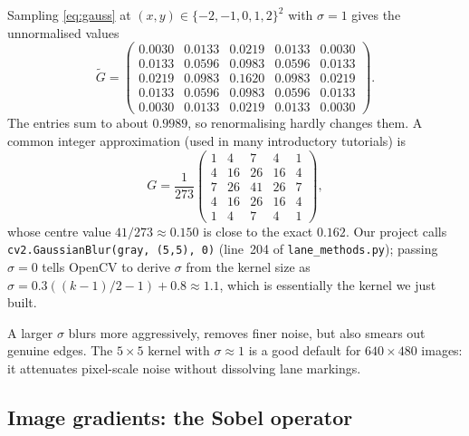 \begin{example}[$5\times 5$ Gaussian with $\sigma=1$]
Sampling \eqref{eq:gauss} at $(x,y)\in\{-2,-1,0,1,2\}^2$ with
$\sigma=1$ gives the unnormalised values
\[
\tilde G=\begin{pmatrix}
0.0030 & 0.0133 & 0.0219 & 0.0133 & 0.0030\\
0.0133 & 0.0596 & 0.0983 & 0.0596 & 0.0133\\
0.0219 & 0.0983 & 0.1620 & 0.0983 & 0.0219\\
0.0133 & 0.0596 & 0.0983 & 0.0596 & 0.0133\\
0.0030 & 0.0133 & 0.0219 & 0.0133 & 0.0030
\end{pmatrix}.
\]
The entries sum to about $0.9989$, so renormalising hardly changes
them. A common integer approximation (used in many introductory
tutorials) is
\[
G = \frac{1}{273}\begin{pmatrix}
1 & 4 & 7 & 4 & 1\\
4 & 16 & 26 & 16 & 4\\
7 & 26 & 41 & 26 & 7\\
4 & 16 & 26 & 16 & 4\\
1 & 4 & 7 & 4 & 1
\end{pmatrix},
\]
whose centre value $41/273\approx 0.150$ is close to the exact
$0.162$. Our project calls
\texttt{cv2.GaussianBlur(gray, (5,5), 0)} (line~204 of
\texttt{lane\_methods.py}); passing $\sigma=0$ tells OpenCV to derive
$\sigma$ from the kernel size as
$\sigma = 0.3((k-1)/2-1)+0.8\approx 1.1$, which is essentially the
kernel we just built.
\end{example}

A larger $\sigma$ blurs more aggressively, removes finer noise, but
also smears out genuine edges. The $5\times 5$ kernel with
$\sigma\approx 1$ is a good default for $640\times 480$ images: it
attenuates pixel-scale noise without dissolving lane markings.

\subsection{Image gradients: the Sobel operator}

